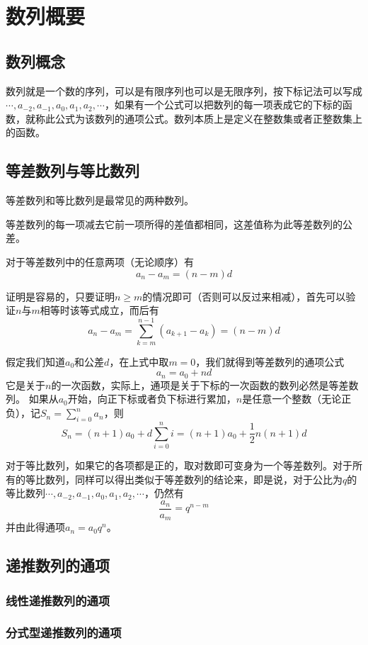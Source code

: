 
\section{数列概要}
\label{sec:number-sequence-general}

\subsection{数列概念}

数列就是一个数的序列，可以是有限序列也可以是无限序列，按下标记法可以写成$\cdots,a_{-2},a_{-1},a_0,a_1,a_2,\cdots$，如果有一个公式可以把数列的每一项表成它的下标的函数，就称此公式为该数列的通项公式。数列本质上是定义在整数集或者正整数集上的函数。

\subsection{等差数列与等比数列}

等差数列和等比数列是最常见的两种数列。

等差数列的每一项减去它前一项所得的差值都相同，这差值称为此等差数列的公差。

对于等差数列中的任意两项（无论顺序）有
$$
a_n-a_m=(n-m)d
$$

证明是容易的，只要证明$n\geqslant m$的情况即可（否则可以反过来相减），首先可以验证$n$与$m$相等时该等式成立，而后有
$$
a_n-a_m=\sum_{k=m}^{n-1}(a_{k+1}-a_k)=(n-m)d
$$

假定我们知道$a_0$和公差$d$，在上式中取$m=0$，我们就得到等差数列的通项公式
$$
a_n=a_0+nd
$$
它是关于$n$的一次函数，实际上，通项是关于下标的一次函数的数列必然是等差数列。
如果从$a_0$开始，向正下标或者负下标进行累加，$n$是任意一个整数（无论正负），记$S_n=\sum_{i=0}^{n}a_n$，则
$$
S_n=(n+1)a_0+d\sum_{i=0}^ni=(n+1)a_0+\frac{1}{2}n(n+1)d
$$

对于等比数列，如果它的各项都是正的，取对数即可变身为一个等差数列。对于所有的等比数列，同样可以得出类似于等差数列的结论来，即是说，对于公比为$q$的等比数列$\cdots,a_{-2},a_{-1},a_0,a_1,a_2,\cdots$，仍然有
$$
\frac{a_n}{a_m}=q^{n-m}
$$
并由此得通项$a_n=a_0q^n$。

\subsection{递推数列的通项}

\subsubsection{线性递推数列的通项}

\subsubsection{分式型递推数列的通项}

